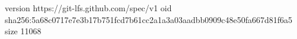 version https://git-lfs.github.com/spec/v1
oid sha256:5a68c0717e7e3b17b751fcd7b61cc2a1a3a03aadbb0909c48e50fa667d81f6a5
size 11068
